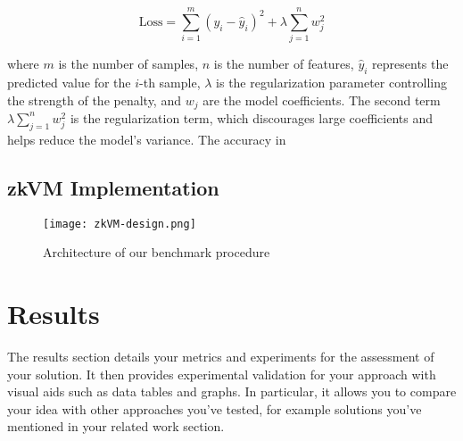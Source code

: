 \documentclass{scrartcl}
\begin{document}
\[
\text{Loss} = \sum_{i=1}^{m} \left( y_i - \hat{y}_i \right)^2 + \lambda \sum_{j=1}^{n} w_j^2
\]

where \( m \) is the number of samples, \( n \) is the number of features, \( \hat{y}_i \) represents the predicted value for the \( i \)-th sample, \( \lambda \) is the regularization parameter controlling the strength of the penalty, and \( w_j \) are the model coefficients. The second term \( \lambda \sum_{j=1}^{n} w_j^2 \) is the regularization term, which discourages large coefficients and helps reduce the model's variance. The accuracy in 

\subsection{zkVM Implementation}



\begin{figure}[H]
	\begin{center}
		\texttt{[image: zkVM-design.png]}
	\end{center}
	\caption{Architecture of our benchmark procedure}
	\label{fig:ascent}
\end{figure}

\section{Results}

The results section details your metrics and experiments for the assessment of your solution. It then provides experimental validation for your approach with visual aids such as data tables and graphs. In particular, it allows you to compare your idea with other approaches you've tested, for example solutions you've mentioned in your related work section.

%
%
%
%
%
\end{document}
